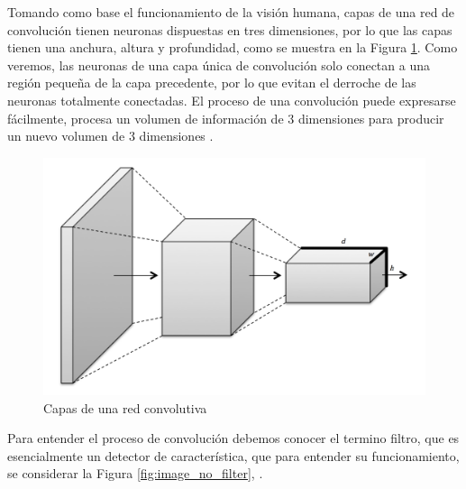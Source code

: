     Tomando como base el funcionamiento de la visión humana, capas de una red de convolución tienen neuronas dispuestas en tres dimensiones, por lo que las capas tienen una anchura, altura y profundidad, como se muestra en la Figura \ref{fig:convnet_scheme}. Como veremos, las neuronas de una capa única de convolución solo conectan a una región pequeña de la capa precedente, por lo que evitan el derroche de las neuronas totalmente conectadas. El proceso de una convolución puede expresarse fácilmente, procesa un volumen de información de 3 dimensiones para producir un nuevo volumen de 3 dimensiones \cite{dlBook}.
    \begin{figure}[htp]
        \centering
        \includegraphics[scale=0.32]{chapter3/convnet_scheme.png}
        \caption{Capas de una red convolutiva}
        \label{fig:convnet_scheme}
    \end{figure}
    Para entender el proceso de convolución debemos conocer el termino filtro, que es esencialmente un detector de característica, que para entender su funcionamiento, se considerar la Figura \ref{fig:image_no_filter}, \cite{dlBook}.
